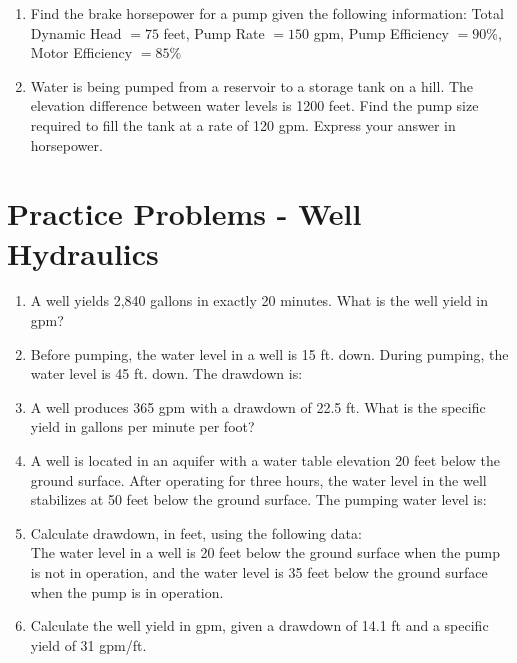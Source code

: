 \begin{enumerate}
  \item Find the brake horsepower for a pump given the following information: Total Dynamic Head $=75$ feet, Pump Rate $=150$ gpm, Pump Efficiency $=90 \%$, Motor Efficiency $=85 \%$

  \item Water is being pumped from a reservoir to a storage tank on a hill. The elevation difference between water levels is 1200 feet. Find the pump size required to fill the tank at a rate of 120 gpm. Express your answer in horsepower.

\end{enumerate}






\section*{Practice Problems - Well Hydraulics}
\begin{enumerate}

\item A well yields 2,840 gallons in exactly 20 minutes. What is the well yield in gpm?\\

\item Before pumping, the water level in a well is 15 ft. down. During pumping, the water level is 45 ft. down. The drawdown is:\\


\item A well produces 365 gpm with a drawdown of 22.5 ft.  What is	the specific yield in gallons per minute per foot?\\


\item A well is located in an aquifer with a water table elevation 20 feet below the ground surface. After operating for three hours, the water level in the well stabilizes at 50 feet below the ground surface. The pumping water level is:\\


\item Calculate drawdown, in feet, using the following data:\\
The water level in a well is 20 feet below the ground surface when the pump is not in operation, and the water level is 35 feet below the ground surface when the pump is in operation.\\


\item Calculate the well yield in gpm, given a drawdown of 14.1 ft and a specific yield of 31
gpm/ft.\\

\end{enumerate}



